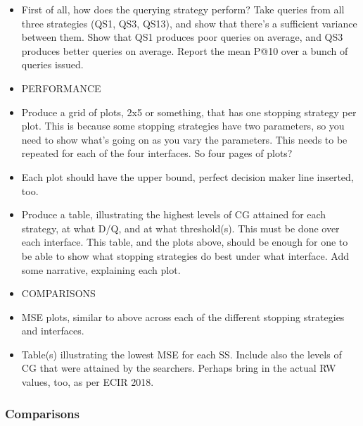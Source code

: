\begin{itemize}
    
    \item{First of all, how does the querying strategy perform? Take queries from all three strategies (QS1, QS3, QS13), and show that there's a sufficient variance between them. Show that QS1 produces poor queries on average, and QS3 produces better queries on average. Report the mean P@10 over a bunch of queries issued.}
    
    \item{PERFORMANCE}
    
    \item{Produce a grid of plots, 2x5 or something, that has one stopping strategy per plot. This is because some stopping strategies have two parameters, so you need to show what's going on as you vary the parameters. This needs to be repeated for each of the four interfaces. So four pages of plots?}
    
    \item{Each plot should have the upper bound, perfect decision maker line inserted, too.}
    
    \item{Produce a table, illustrating the highest levels of CG attained for each strategy, at what D/Q, and at what threshold(s). This must be done over each interface. This table, and the plots above, should be enough for one to be able to show what stopping strategies do best under what interface. Add some narrative, explaining each plot.}
    
    \item{COMPARISONS}
    
    \item{MSE plots, similar to above across each of the different stopping strategies and interfaces.}
    
    \item{Table(s) illustrating the lowest MSE for each SS. Include also the levels of CG that were attained by the searchers. Perhaps bring in the actual RW values, too, as per ECIR 2018.}
    
\end{itemize}

\subsubsection{Comparisons}\label{sec:snippets:simulations:results:comparisons}

